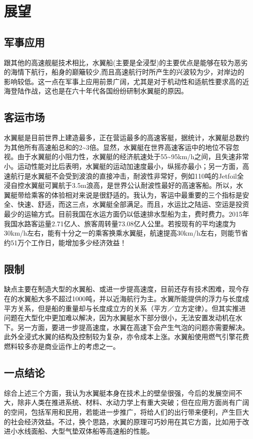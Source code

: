 \documentclass[10.5pt,twocolumn]{jbuaa}
\begin{document}
\section{展望}
\subsection{军事应用}
跟其他的高速舰艇技术相比，水翼船(主要是全浸型)的主要优点是能够在较为恶劣的海情下航行，船身的巅簸较少,而且高速航行时所产生的兴波较为少，对岸边的影响较低。这一点在军事上应用前景广阔，尤其是对于机动性和适航性要求高的近海登陆作战，这也是在六十年代各国纷纷研制水翼艇的原因。
\subsection{客运市场}
水翼艇是目前世界上建造最多，正在营运最多的高速客艇，据统计，水翼艇总数约为其他所有高速船总和的2\~{}3倍。显然，水翼艇在世界高速客运中的地位不容忽视。由于水翼艇的小阻力性，水翼艇的经济航速处于55\~{}95km/h之间，且失速非常小。运动性能对比后表明，水翼艇的运动加速度最小，纵摇亦最小；另一方面，高速航行是水翼艇不会受到波浪的直接冲击，耐波性非常好，例如110吨的Jetfoil全浸自控水翼艇可翼航于3.5m浪高，是世界公认耐波性最好的高速客船。所以，水翼艇带给乘客的体验相对来说是很舒适的。我认为，客运中最重要的三个指标是安全、快速、舒适，而这三点，水翼艇全部满足。而且，水运比之陆运、空运是投资最少的运输方式。目前我国在水运方面仍以低速排水型船为主，费时费力。2015年我国水路客运量2.71亿人、旅客周转量73.08亿人公里。若按现有的平均速度为30km/h左右，能有十分之一的乘客换乘水翼艇，航速提高30km/h左右，则能节省约51万个工作日，能增加多少经济效益！
\subsection{限制}
缺点主要在制造大型的水翼船、或进一步提高速度，目前还存有技术困难，现今存在的水翼船大多不超过1000吨，并以近海航行为主。水翼所能提供的浮力与长度成平方关系，但是船的重量却与长度成立方的关系（平方／立方定律）。但其实推进问题在大型化中更加难以解决，因为水翼艇水下部分很小，无法安置发动机在水下。另一方面，要进一步提高速度，水翼在高速下会产生气泡的问题亦需要解决。此外全浸式水翼的结构及控制较为复杂，亦令成本上涨。水翼船使用燃气引擎花费燃料较多亦是商业运作上的考虑之一。
\subsection{一点结论}
综合上述三个方面，我认为水翼艇本身在技术上的壁垒很强，今后的发展空间不大，除非人类在推进系统、材料、水动力学上有重大突破；但在应用方面尚有广阔的空间，包括军用和民用，若能进一步推广，将给人们的出行带来便利，产生巨大的社会经济效益。不过，换个思路，水翼的原理可巧妙用在其它方面，比如用于改进小水线面船、大型气垫双体船等高速船的性能。
\end{document}

